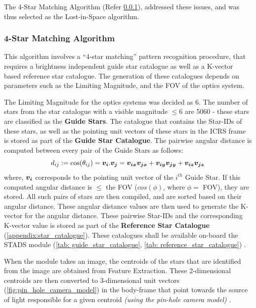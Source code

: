 \documentclass[../../main.tex]{subfiles}
\begin{document}
The 4-Star Matching Algorithm (Refer \ref{sec:4SM}), addressed these issues, and was thus selected as the Lost-in-Space algorithm.


\subsubsection{4-Star Matching Algorithm}
\label{sec:4SM}

This algorithm \cite{dong2006brightness} involves a “4-star matching” pattern recognition procedure, that requires a  brightness independent guide star catalogue as well as a K-vector based reference star catalogue. The generation of these catalogues depends on parameters such as the Limiting Magnitude, and the FOV of the optics system.

The Limiting Magnitude for the optics systems was decided as 6. The number of stars from the star catalogue with a visible magnitude $\le 6$ are 5060 - these stars are classified as the \textbf{Guide Stars}. The catalogue that contains the Star-IDs of these stars, as well as the pointing unit vectors of these stars in the ICRS frame is stored as part of the \textbf{Guide Star Catalogue}.
The pairwise angular distance is computed between every pair of the Guide Stars as follows:
\begin{equation}
    d_{ij} := \cos(\theta_{ij}) = \boldsymbol{v_i}.\boldsymbol{v_j} = \boldsymbol{v_{ix}}\boldsymbol{v_{jx}} + \boldsymbol{v_{iy}}\boldsymbol{v_{jy}} + \boldsymbol{v_{iz}}\boldsymbol{v_{jz}}
    \label{eq:ST_AngDst}
\end{equation}
where, $\boldsymbol{v_i}$ corresponds to the pointing unit vector of the $i^{th}$ Guide Star.
If this computed angular distance is $\le$ the FOV ($cos(\phi)$, where $\phi=$ FOV), they are stored.
All such pairs of stars are then compiled, and are sorted based on their angular distance. These angular distance values are then used to generate the K-vector for the angular distance. These pairwise Star-IDs and the corresponding K-vector value is stored as part of the \textbf{Reference Star Catalogue} (\ref{appendix:star_catalogue}). These catalogues shall be available on-board the STADS module (\ref{tab: guide_star_catalogue}, \ref{tab: reference_star_catalogue})    .

 
When the module takes an image, the centroids of the stars that are identified from the image are obtained from Feature Extraction. These 2-dimensional centroids are then converted to 3-dimensional unit vectors (\ref{fig:pin_hole_camera_model}) in the body-frame that point towards the source of light responsible for a given centroid \textit{(using the pin-hole camera model)} \cite{erlank2013development}.
\end{document}
